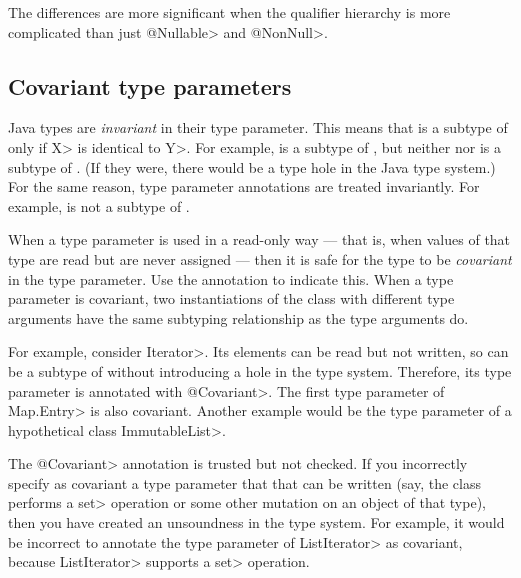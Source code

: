 The differences are more
significant when the qualifier hierarchy is more complicated than just
\<@Nullable> and \<@NonNull>.

\subsection{Covariant type parameters\label{covariant-type-parameters}}

Java types are \emph{invariant} in their type parameter.  This means that
 is a subtype of  only if \<X> is identical to \<Y>.  For
example,  is a subtype of , but
neither  nor  is a subtype of
.  (If they were, there would be a type hole in the Java
type system.)  For the same reason, type parameter annotations are treated
invariantly.  For example,  is not a subtype
of .

When a type parameter is used in a read-only way --- that is, when values
of that type are read but are never assigned --- then it is safe for the
type to be \emph{covariant} in the type parameter.  Use the  annotation to indicate
this.
When a type parameter is covariant, two instantiations of the class with
different type arguments have the same subtyping relationship as the type
arguments do.

For example, consider \<Iterator>.  Its elements can be read but not
written, so  can be a subtype of
 without introducing a hole in the type system.
Therefore, its type parameter is annotated with \<@Covariant>.
The first type parameter of \<Map.Entry> is also covariant.
Another example would be the type parameter of a hypothetical class
\<ImmutableList>.

The \<@Covariant> annotation is trusted but not checked.
If you incorrectly specify as covariant a type parameter that that can be
written (say, the class performs a
\<set> operation or some other mutation on an object of that type), then
you have created an unsoundness in the type system.
For example, it would be incorrect to annotate the type parameter of
\<ListIterator> as covariant, because \<ListIterator> supports a \<set>
operation.


